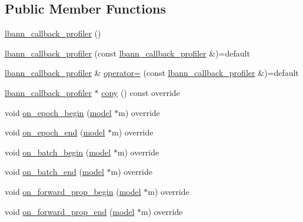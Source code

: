 \subsection*{Public Member Functions}
\begin{DoxyCompactItemize}
\item 
\hyperlink{classlbann_1_1lbann__callback__profiler_aa1df0f5400362d0b4c469df5d4657eed}{lbann\+\_\+callback\+\_\+profiler} ()
\item 
\hyperlink{classlbann_1_1lbann__callback__profiler_ad55c2dd945f3867ae984ff94e761b05a}{lbann\+\_\+callback\+\_\+profiler} (const \hyperlink{classlbann_1_1lbann__callback__profiler}{lbann\+\_\+callback\+\_\+profiler} \&)=default
\item 
\hyperlink{classlbann_1_1lbann__callback__profiler}{lbann\+\_\+callback\+\_\+profiler} \& \hyperlink{classlbann_1_1lbann__callback__profiler_ad9c93def349b324a9f3a20c73a5f29a0}{operator=} (const \hyperlink{classlbann_1_1lbann__callback__profiler}{lbann\+\_\+callback\+\_\+profiler} \&)=default
\item 
\hyperlink{classlbann_1_1lbann__callback__profiler}{lbann\+\_\+callback\+\_\+profiler} $\ast$ \hyperlink{classlbann_1_1lbann__callback__profiler_a53351de95859a8a9f3a689ed72970663}{copy} () const override
\item 
void \hyperlink{classlbann_1_1lbann__callback__profiler_abd30d11df631eea086cdf213c9f0f4f9}{on\+\_\+epoch\+\_\+begin} (\hyperlink{classlbann_1_1model}{model} $\ast$m) override
\item 
void \hyperlink{classlbann_1_1lbann__callback__profiler_a86e0fbe550ff42660766977604d9d5a6}{on\+\_\+epoch\+\_\+end} (\hyperlink{classlbann_1_1model}{model} $\ast$m) override
\item 
void \hyperlink{classlbann_1_1lbann__callback__profiler_a4a60f7470bf36c6833862d47d1a7ce01}{on\+\_\+batch\+\_\+begin} (\hyperlink{classlbann_1_1model}{model} $\ast$m) override
\item 
void \hyperlink{classlbann_1_1lbann__callback__profiler_ad7db0233f3a0c91c10a15d0951bb1747}{on\+\_\+batch\+\_\+end} (\hyperlink{classlbann_1_1model}{model} $\ast$m) override
\item 
void \hyperlink{classlbann_1_1lbann__callback__profiler_a027fe89a27c52ae80a1982f96dd62455}{on\+\_\+forward\+\_\+prop\+\_\+begin} (\hyperlink{classlbann_1_1model}{model} $\ast$m) override
\item 
void \hyperlink{classlbann_1_1lbann__callback__profiler_a63e3ad301cf8529acda00ac8f2531c93}{on\+\_\+forward\+\_\+prop\+\_\+end} (\hyperlink{classlbann_1_1model}{model} $\ast$m) override

\end{DoxyCompactItemize}
